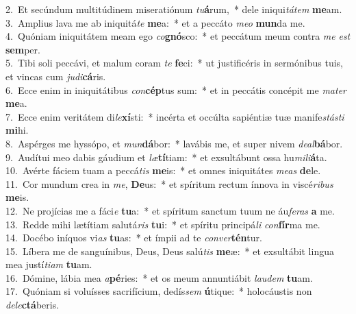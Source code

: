 {2.~}Et secúndum multitúdinem miseratiónum \textit{tu}\textbf{á}rum,~* dele iniqui\textit{tá}\textit{tem} \textbf{me}am.\\
{3.~}Amplius lava me ab iniquitá\textit{te} \textbf{me}a:~* et a peccáto \textit{me}\textit{o} \textbf{mun}da me.\\
{4.~}Quóniam iniquitátem meam ego \textit{co}\textbf{gnó}sco:~* et peccátum meum contra \textit{me} \textit{est} \textbf{sem}per.\\
{5.~}Tibi soli peccávi, et malum coram \textit{te} \textbf{fe}ci:~* ut justificéris in sermónibus tuis, et vincas cum \textit{ju}\textit{di}\textbf{cá}ris.\\
{6.~}Ecce enim in iniquitátibus \textit{con}\textbf{cép}tus sum:~* et in peccátis concépit me \textit{ma}\textit{ter} \textbf{me}a.\\
{7.~}Ecce enim veritátem di\textit{le}\textbf{xí}sti:~* incérta et occúlta sapiéntiæ tuæ manife\textit{stá}\textit{sti} \textbf{mi}hi.\\
{8.~}Aspérges me hyssópo, et \textit{mun}\textbf{dá}bor:~* lavábis me, et super nivem \textit{de}\textit{al}\textbf{bá}bor.\\
{9.~}Audítui meo dabis gáudium et \textit{læ}\textbf{tí}tiam:~* et exsultábunt ossa hu\textit{mi}\textit{li}\textbf{á}ta.\\
{10.~}Avérte fáciem tuam a peccá\textit{tis} \textbf{me}is:~* et omnes iniquitátes \textit{me}\textit{as} \textbf{de}le.\\
{11.~}Cor mundum crea in \textit{me}, \textbf{De}us:~* et spíritum rectum ínnova in viscé\textit{ri}\textit{bus} \textbf{me}is.\\
{12.~}Ne projícias me a fáci\textit{e} \textbf{tu}a:~* et spíritum sanctum tuum ne áu\textit{fe}\textit{ras} \textbf{a} me.\\
{13.~}Redde mihi lætítiam salutá\textit{ris} \textbf{tu}i:~* et spíritu principá\textit{li} \textit{con}\textbf{fír}ma me.\\
{14.~}Docébo iníquos vi\textit{as} \textbf{tu}as:~* et ímpii ad te \textit{con}\textit{ver}\textbf{tén}tur.\\
{15.~}Líbera me de sanguínibus, Deus, Deus salú\textit{tis} \textbf{me}æ:~* et exsultábit lingua mea justí\textit{ti}\textit{am} \textbf{tu}am.\\
{16.~}Dómine, lábia mea \textit{a}\textbf{pé}ries:~* et os meum annuntiábit \textit{lau}\textit{dem} \textbf{tu}am.\\
{17.~}Quóniam si voluísses sacrifícium, dedís\textit{sem} \textbf{ú}tique:~* holocáustis non \textit{de}\textit{le}\textbf{ctá}beris.\\
